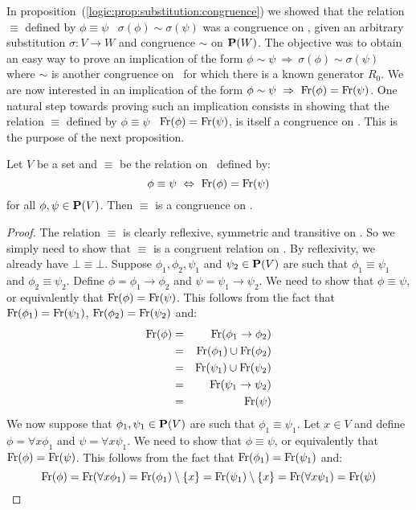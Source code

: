 In proposition~(\ref{logic:prop:substitution:congruence}) we showed
that the relation $\equiv$ defined by $\phi\equiv\psi$ \ifand\
$\sigma(\phi)\sim\sigma(\psi)$ was a congruence on \pv, given an
arbitrary substitution $\sigma:V\to W$ and congruence $\sim$ on
${\bf P}(W)$. The objective was to obtain an easy way to prove an
implication of the form $\phi\sim\psi\ \Rightarrow\
\sigma(\phi)\sim\sigma(\psi)$ where $\sim$ is another congruence on
\pv\ for which there is a known generator $R_{0}$. We are now
interested in an implication of the form $\phi\sim\psi\ \Rightarrow\
\mbox{\rm Fr}(\phi)=\mbox{\rm Fr}(\psi)$. One natural step towards proving such an
implication consists in showing that the relation $\equiv$ defined
by $\phi\equiv\psi$ \ifand\ $\mbox{\rm Fr}(\phi)=\mbox{\rm Fr}(\psi)$, is itself a
congruence on \pv. This is the purpose of the next proposition.


\begin{prop}\label{logic:prop:congruence:freevar}
Let $V$ be a set and $\equiv$ be the relation on \pv\ defined by:
    \[
    \phi\equiv\psi\ \Leftrightarrow\ \free(\phi)=\free(\psi)
    \]
for all $\phi,\psi\in\mbox{${\bf P}(V)$}$. Then $\equiv$ is a congruence on \pv.
\end{prop}
\begin{proof}
The relation $\equiv$ is clearly reflexive, symmetric and transitive
on \pv. So we simply need to show that $\equiv$ is a congruent
relation on \pv. By reflexivity, we already have $\bot\equiv\bot$.
Suppose $\phi_{1},\phi_{2},\psi_{1}$ and $\psi_{2}\in\mbox{${\bf P}(V)$}$ are such
that $\phi_{1}\equiv\psi_{1}$ and $\phi_{2}\equiv\psi_{2}$. Define
$\phi=\phi_{1}\to\phi_{2}$ and $\psi=\psi_{1}\to\psi_{2}$. We need
to show that $\phi\equiv\psi$, or equivalently that
$\mbox{\rm Fr}(\phi)=\mbox{\rm Fr}(\psi)$. This follows from the fact that
$\mbox{\rm Fr}(\phi_{1})=\mbox{\rm Fr}(\psi_{1})$, $\mbox{\rm Fr}(\phi_{2})=\mbox{\rm Fr}(\psi_{2})$
and:
    \begin{eqnarray*}
    \mbox{\rm Fr}(\phi)&=&\mbox{\rm Fr}(\phi_{1}\to\phi_{2})\\
    &=&\mbox{\rm Fr}(\phi_{1})\cup\mbox{\rm Fr}(\phi_{2})\\
    &=&\mbox{\rm Fr}(\psi_{1})\cup\mbox{\rm Fr}(\psi_{2})\\
    &=&\mbox{\rm Fr}(\psi_{1}\to\psi_{2})\\
    &=&\mbox{\rm Fr}(\psi)
    \end{eqnarray*}
We now suppose that $\phi_{1},\psi_{1}\in\mbox{${\bf P}(V)$}$ are such that
$\phi_{1}\equiv\psi_{1}$. Let $x\in V$ and define $\phi=\forall
x\phi_{1}$ and $\psi=\forall x\psi_{1}$. We need to show that
$\phi\equiv\psi$, or equivalently that $\mbox{\rm Fr}(\phi)=\mbox{\rm Fr}(\psi)$.
This follows from the fact that $\mbox{\rm Fr}(\phi_{1})=\mbox{\rm Fr}(\psi_{1})$
and:
    \[
    \mbox{\rm Fr}(\phi)=\mbox{\rm Fr}(\forall x\phi_{1})
    =\mbox{\rm Fr}(\phi_{1})\setminus\{x\}
    =\mbox{\rm Fr}(\psi_{1})\setminus\{x\}
    =\mbox{\rm Fr}(\forall x\psi_{1})
    =\mbox{\rm Fr}(\psi)
    \]
\end{proof}
